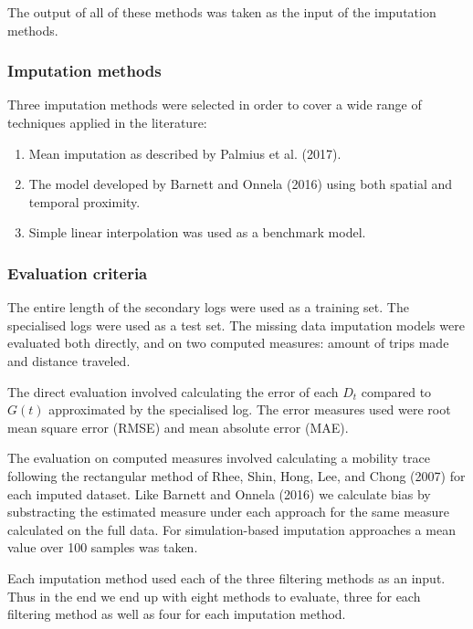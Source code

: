 \documentclass[english,man]{apa6}
\providecommand{\tightlist}{%
  \setlength{\itemsep}{0pt}\setlength{\parskip}{0pt}}
\theoremstyle{definition}
\theoremstyle{definition}
\theoremstyle{definition}
\theoremstyle{remark}
\begin{document}
The output of all of these methods was taken as the input of the
imputation methods.

\subsubsection{Imputation methods}\label{imputation-methods}

Three imputation methods were selected in order to cover a wide range of
techniques applied in the literature:

\begin{enumerate}
\def\labelenumi{\arabic{enumi}.}
\tightlist
\item
  Mean imputation as described by Palmius et al. (2017).
\item
  The model developed by Barnett and Onnela (2016) using both spatial
  and temporal proximity.
\item
  Simple linear interpolation was used as a benchmark model.
\end{enumerate}

\subsubsection{Evaluation criteria}\label{evaluation-criteria}

The entire length of the secondary logs were used as a training set. The
specialised logs were used as a test set. The missing data imputation
models were evaluated both directly, and on two computed measures:
amount of trips made and distance traveled.

The direct evaluation involved calculating the error of each \(D_t\)
compared to \(G(t)\) approximated by the specialised log. The error
measures used were root mean square error (RMSE) and mean absolute error
(MAE).

The evaluation on computed measures involved calculating a mobility
trace following the rectangular method of Rhee, Shin, Hong, Lee, and
Chong (2007) for each imputed dataset. Like Barnett and Onnela (2016) we
calculate bias by substracting the estimated measure under each approach
for the same measure calculated on the full data. For simulation-based
imputation approaches a mean value over 100 samples was taken.

Each imputation method used each of the three filtering methods as an
input. Thus in the end we end up with eight methods to evaluate, three
for each filtering method as well as four for each imputation method.
\end{document}
